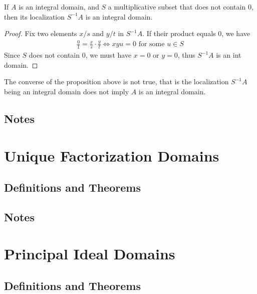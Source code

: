 \begin{thmbox}
    \begin{proposition}
        If \(A\) is an integral domain, and \(S\) a multiplicative subset that does not contain \(0\), then its localization \(S^{-1}A\) is an integral domain.
    \end{proposition}
\end{thmbox}
\begin{proof}
    Fix two elements \(x/s\) and \(y/t\) in \(S^{-1}A\). If their product equals \(0\), we have
    \begin{align*}
        \frac{0}{1} = \frac{x}{s} \cdot \frac{y}{t} \iff xyu = 0 \text{ for some } u \in S
    \end{align*}
    Since \(S\) does not contain \(0\), we must have \(x = 0\) or \(y = 0\), thus \(S^{-1}A\) is an int domain.
\end{proof}

\begin{exmbox}
    \begin{example}
        The converse of the proposition above is not true, that is the localization \(S^{-1}A\) being an integral domain does not imply \(A\) is an integral domain.
    \end{example}
\end{exmbox}
\subsection*{Notes}

\newpage
\section{Unique Factorization Domains}
\subsection*{Definitions and Theorems}
\subsection*{Notes}

\newpage
\section{Principal Ideal Domains}
\subsection*{Definitions and Theorems}


